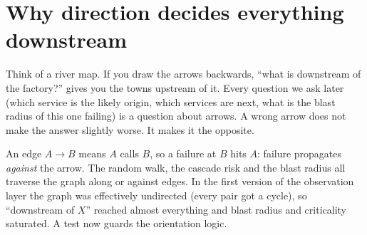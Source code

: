 \section{Why direction decides everything downstream}
\begin{simplebox}
Think of a river map. If you draw the arrows backwards, ``what is downstream of the factory?'' gives you the towns upstream of it. Every question we ask later (which service is the likely origin, which services are next, what is the blast radius of this one failing) is a question about arrows. A wrong arrow does not make the answer slightly worse. It makes it the opposite.
\end{simplebox}

\begin{techbox}
An edge $A\to B$ means $A$ calls $B$, so a failure at $B$ hits $A$: failure propagates \emph{against} the arrow. The random walk, the cascade risk and the blast radius all traverse the graph along or against edges. In the first version of the observation layer the graph was effectively undirected (every pair got a cycle), so ``downstream of $X$'' reached almost everything and blast radius and criticality saturated. A test now guards the orientation logic.
\end{techbox}
